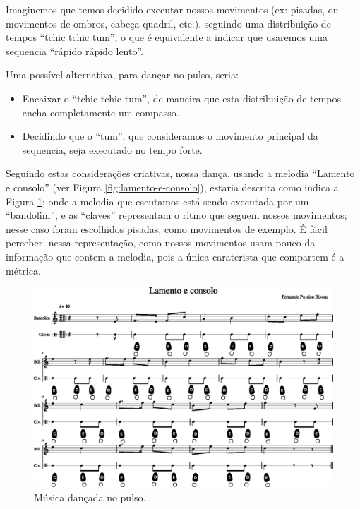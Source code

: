 \begin{example}
\label{ex:dance:pulso}
Imaginemos que temos decidido executar nossos movimentos (ex: pisadas, ou movimentos de ombros, cabeça quadril, etc.),
seguindo uma distribuição de tempos ``tchic tchic tum'',
o que é equivalente a indicar que usaremos uma sequencia ``rápido rápido lento''.

Uma possível alternativa, para dançar no pulso, 
seria:
\begin{itemize} 
\item Encaixar o ``tchic tchic tum'', 
de maneira que esta distribuição de tempos encha completamente um compasso.
\item Decidindo  que o ``tum'', 
que consideramos o movimento principal da sequencia,
seja executado no tempo forte.
\end{itemize}

Seguindo estas considerações criativas,
nossa dança, 
usando a melodia ``Lamento e consolo'' (ver Figura \ref{fig:lamento-e-consolo}), 
estaria descrita como indica a Figura \ref{fig:lamentoconsolopulso1};
onde a melodia que escutamos está sendo executada por um ``bandolim'',
e as ``claves'' representam o ritmo que seguem nossos movimentos;
nesse caso foram escolhidos pisadas, como movimentos de exemplo.
É fácil perceber, nessa representação, 
como nossos movimentos usam pouco da informação que contem a melodia, 
pois a única caraterista que compartem é a métrica.
\end{example}
\begin{figure}
    \centering
    \includegraphics[width=\textwidth]{chapters/cap-musicalidade-tecnica/lamento-e-consolo-clave-pulso-1.eps}
    \caption{Música dançada no pulso.}
    \label{fig:lamentoconsolopulso1}
\end{figure}

